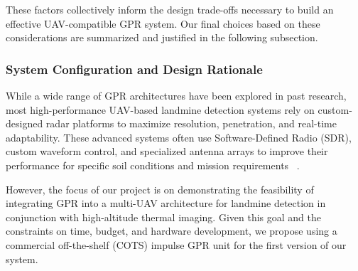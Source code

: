 These factors collectively inform the design trade-offs necessary to build an effective UAV-compatible GPR system. Our final choices based on these considerations are summarized and justified in the following subsection.


\subsubsection{System Configuration and Design Rationale}

While a wide range of GPR architectures have been explored in past research, most high-performance UAV-based landmine detection systems rely on custom-designed radar platforms to maximize resolution, penetration, and real-time adaptability. These advanced systems often use Software-Defined Radio (SDR), custom waveform control, and specialized antenna arrays to improve their performance for specific soil conditions and mission requirements ~\cite{cerquera2017uav}.

However, the focus of our project is on demonstrating the feasibility of integrating GPR into a multi-UAV architecture for landmine detection in conjunction with high-altitude thermal imaging. Given this goal and the constraints on time, budget, and hardware development, we propose using a commercial off-the-shelf (COTS) impulse GPR unit for the first version of our system.

